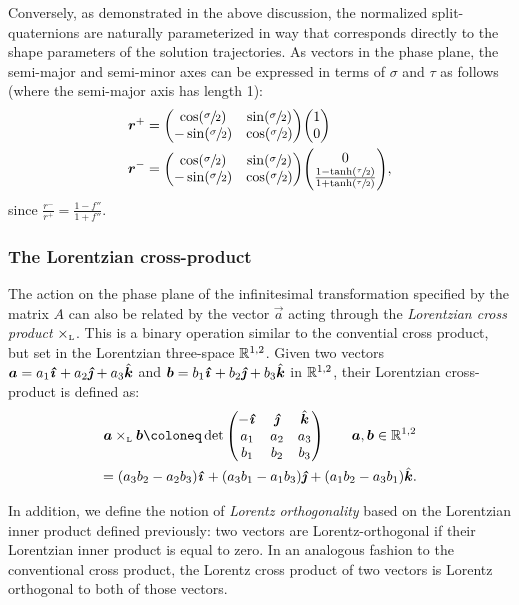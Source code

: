 Conversely, as demonstrated in the above discussion, the normalized split-quaternions are naturally parameterized in way that corresponds directly to the shape parameters of the solution trajectories. As vectors in the phase plane, the semi-major and semi-minor axes can be expressed in terms of $\sigma$ and $\tau$ as follows (where the semi-major axis has length 1):
\begin{equation}
    \begin{split}
        \vec{r}^+ &= \mqty(\cos(\sfrac{\sigma}{2}) & \sin(\sfrac{\sigma}{2}) \\ -\sin(\sfrac{\sigma}{2}) & \cos(\sfrac{\sigma}{2}))\mqty(1 \\ 0 ) \\
        \vec{r}^- &= \mqty(\cos(\sfrac{\sigma}{2}) & \sin(\sfrac{\sigma}{2}) \\ -\sin(\sfrac{\sigma}{2}) & \cos(\sfrac{\sigma}{2}))\mqty( 0 \\ \frac{1 - \tanh(\sfrac{\tau}{2})}{1 + \tanh(\sfrac{\tau}{2})}), \\
    \end{split}
    \label{eq:major_axes}
\end{equation}
since $\displaystyle \frac{r^-}{r^+} = \frac{1 - f''}{1 + f''}$.

\subsubsection{The Lorentzian cross-product}
The action on the phase plane of the infinitesimal transformation specified by the matrix $A$ can also be related by the vector $\vec{a}$ acting through the \emph{Lorentzian cross product} $\times_\text{\tiny{L}} $. This is a binary operation similar to the convential cross product, but set in the Lorentzian three-space $\mathbb{R}^{1, 2}$. Given two vectors $\vec{a} = a_1\quati + a_2\quatj + a_3\quatk$ and $\vec{b} = b_1\quati + b_2\quatj + b_3\quatk$ in $\mathbb{R}^{1, 2}$, their Lorentzian cross-product is defined as: \cite{Jafari2014}
\begin{gather}
        \lorcrossp{\vec{a}}{\vec{b}} \coloneq \det\mqty(-\quati & \quatj & \quatk \\ a_1 & a_2 & a_3 \\ b_1 & b_2 & b_3) \qquad \vec{a}, \vec{b} \in \real^{1, 2} \\
            = \qty(a_3b_2 - a_2b_3)\quati + \qty(a_3b_1 - a_1b_3)\quatj + \qty(a_1b_2 - a_3b_1)\quatk.
\end{gather}

In addition, we define the notion of \emph{Lorentz orthogonality} based on the Lorentzian inner product defined previously: two vectors are Lorentz-orthogonal if their Lorentzian inner product is equal to zero. In an analogous fashion to the conventional cross product, the Lorentz cross product of two vectors is Lorentz orthogonal to both of those vectors.

